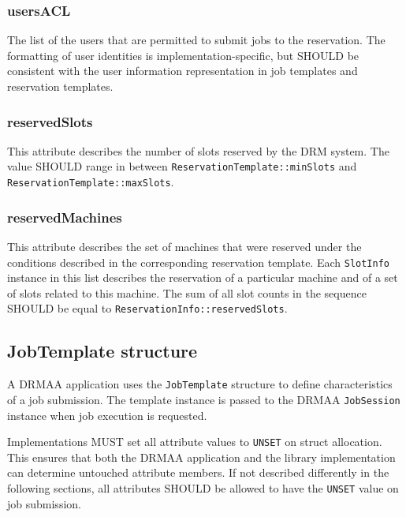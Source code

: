 \documentclass{article}
\newcommand{\h}[1]{\lstinline|#1|}
\newcommand{\rat}[1]{}
\begin{document}
\rat{Mai 18th 2011 conf call rejected to treat UNSET as unrestricted end time (i.e. ``plus infinity'') here.}

\subsubsection{usersACL}

The list of the users that are permitted to submit jobs to the reservation. The formatting of user identities is implementation-specific, but SHOULD be consistent with the user information representation in job templates and reservation templates.

\subsubsection{reservedSlots}

This attribute describes the number of slots  reserved by the DRM system.
The value SHOULD range in between \h{ReservationTemplate::minSlots} and \h{ReservationTemplate::maxSlots}.

\subsubsection{reservedMachines}

This attribute describes the set of machines that were reserved under the conditions described in the corresponding reservation template. Each \h{SlotInfo} instance in this list describes the reservation of a particular machine and of a set of slots related to this machine. The sum of all slot counts in the sequence SHOULD be equal to \h{ReservationInfo::reservedSlots}.

\subsection{JobTemplate structure}
\label{sec:jobtemplate}

A DRMAA application uses the \h{JobTemplate} structure to define characteristics of a job submission. The template instance is passed to the DRMAA \h{JobSession} instance when job execution is requested.



Implementations MUST set all attribute values to \h{UNSET} on struct allocation. This ensures that both the DRMAA application and the library implementation can determine untouched attribute members. If not described differently in the following sections, all attributes SHOULD be allowed to have the \h{UNSET} value on job submission.
\end{document}
